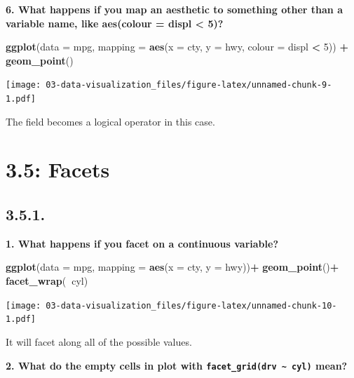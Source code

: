 \documentclass[]{book}
\newenvironment{Shaded}{\begin{snugshade}}{\end{snugshade}}
\newcommand{\DataTypeTok}[1]{\textcolor[rgb]{0.13,0.29,0.53}{#1}}
\newcommand{\DecValTok}[1]{\textcolor[rgb]{0.00,0.00,0.81}{#1}}
\newcommand{\KeywordTok}[1]{\textcolor[rgb]{0.13,0.29,0.53}{\textbf{#1}}}
\newcommand{\NormalTok}[1]{#1}
\newcommand{\OperatorTok}[1]{\textcolor[rgb]{0.81,0.36,0.00}{\textbf{#1}}}
\newcommand{\StringTok}[1]{\textcolor[rgb]{0.31,0.60,0.02}{#1}}
\theoremstyle{definition}
\theoremstyle{definition}
\theoremstyle{definition}
\theoremstyle{remark}
\begin{document}
\textbf{6. What happens if you map an aesthetic to something other than
a variable name, like aes(colour = displ \textless{} 5)?}

\begin{Shaded}
\begin{Highlighting}[]
\KeywordTok{ggplot}\NormalTok{(}\DataTypeTok{data =}\NormalTok{ mpg, }\DataTypeTok{mapping =} \KeywordTok{aes}\NormalTok{(}\DataTypeTok{x =}\NormalTok{ cty, }\DataTypeTok{y =}\NormalTok{ hwy, }\DataTypeTok{colour =}\NormalTok{ displ }\OperatorTok{<}\StringTok{ }\DecValTok{5}\NormalTok{)) }\OperatorTok{+}
\StringTok{  }\KeywordTok{geom_point}\NormalTok{()}
\end{Highlighting}
\end{Shaded}

\texttt{[image: 03-data-visualization\_files/figure-latex/unnamed-chunk-9-1.pdf]}

The field becomes a logical operator in this case.

\hypertarget{facets}{%
\section{3.5: Facets}\label{facets}}

\hypertarget{section-2}{%
\subsection{3.5.1.}\label{section-2}}

\textbf{1. What happens if you facet on a continuous variable?}

\begin{Shaded}
\begin{Highlighting}[]
\KeywordTok{ggplot}\NormalTok{(}\DataTypeTok{data =}\NormalTok{ mpg, }\DataTypeTok{mapping =} \KeywordTok{aes}\NormalTok{(}\DataTypeTok{x =}\NormalTok{ cty, }\DataTypeTok{y =}\NormalTok{ hwy))}\OperatorTok{+}
\StringTok{  }\KeywordTok{geom_point}\NormalTok{()}\OperatorTok{+}
\StringTok{  }\KeywordTok{facet_wrap}\NormalTok{(}\OperatorTok{~}\NormalTok{cyl)}
\end{Highlighting}
\end{Shaded}

\texttt{[image: 03-data-visualization\_files/figure-latex/unnamed-chunk-10-1.pdf]}

It will facet along all of the possible values.

\textbf{2. What do the empty cells in plot with
\texttt{facet\_grid(drv\ \textasciitilde{}\ cyl)} mean?}
\end{document}
